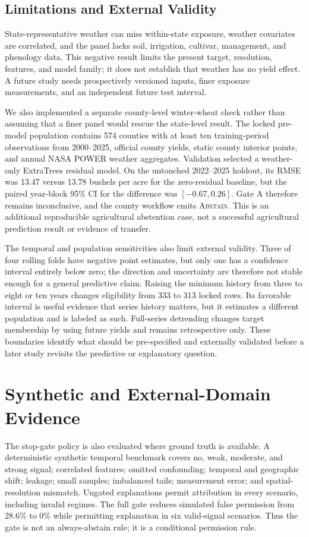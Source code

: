 \documentclass[conference]{IEEEtran}
\begin{document}
\subsection{Limitations and External Validity}
State-representative weather can miss within-state exposure, weather covariates are
correlated, and the panel lacks soil, irrigation, cultivar, management, and
phenology data. This negative result limits the present target, resolution,
features, and model family; it does not establish that weather has no yield effect.
A future study needs prospectively versioned inputs, finer exposure measurements,
and an independent future test interval.

We also implemented a separate county-level winter-wheat check rather than
assuming that a finer panel would rescue the state-level result. The locked
pre-model population contains 574 counties with at least ten training-period
observations from 2000--2025, official county yields, static county interior
points, and annual NASA POWER weather aggregates. Validation selected a
weather-only ExtraTrees residual model. On the untouched 2022--2025 holdout,
its RMSE was 13.47 versus 13.78 bushels per acre for the zero-residual baseline,
but the paired year-block 95\% CI for the difference was $[-0.67,0.26]$.
Gate A therefore remains inconclusive, and the county workflow emits
\textsc{Abstain}. This is an additional reproducible agricultural abstention
case, not a successful agricultural prediction result or evidence of transfer.

The temporal and population sensitivities also limit external validity. Three of
four rolling folds have negative point estimates, but only one has a confidence
interval entirely below zero; the direction and uncertainty are therefore not stable
enough for a general predictive claim. Raising the minimum history from three to
eight or ten years changes eligibility from 333 to 313 locked rows. Its favorable
interval is useful evidence that series history matters, but it estimates a different
population and is labeled as such. Full-series detrending changes target membership
by using future yields and remains retrospective only. These boundaries identify
what should be pre-specified and externally validated before a later study revisits
the predictive or explanatory question.

\section{Synthetic and External-Domain Evidence}
The stop-gate policy is also evaluated where ground truth is available. A
deterministic synthetic temporal benchmark covers no, weak, moderate, and strong
signal; correlated features; omitted confounding; temporal and geographic shift;
leakage; small samples; imbalanced tails; measurement error; and spatial-resolution
mismatch. Ungated explanations permit attribution in every scenario, including
invalid regimes. The full gate reduces simulated false permission from 28.6\% to
0\% while permitting explanation in six valid-signal scenarios. Thus the gate is
not an always-abstain rule; it is a conditional permission rule.
\end{document}
